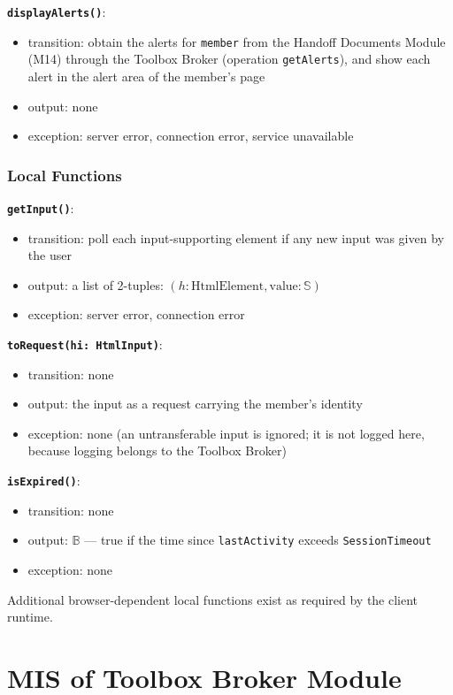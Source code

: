 \documentclass[12pt, titlepage]{article}
\begin{document}
\textbf{\texttt{displayAlerts()}}:
\begin{itemize}
  \item transition: obtain the alerts for \texttt{member} from the Handoff Documents Module (M14) through the Toolbox Broker (operation \texttt{getAlerts}), and show each alert in the alert area of the member's page
  \item output: none
  \item exception: server error, connection error, service unavailable
\end{itemize}

\subsubsection{Local Functions}

\textbf{\texttt{getInput()}}:
\begin{itemize}
  \item transition: poll each input-supporting element if any new input was given by the user
  \item output: a list of 2-tuples: $(h: \text{HtmlElement}, \text{value}: \mathbb{S})$
  \item exception: server error, connection error
\end{itemize}

\textbf{\texttt{toRequest(hi: HtmlInput)}}:
\begin{itemize}
  \item transition: none
  \item output: the input as a request carrying the member's identity
  \item exception: none (an untransferable input is ignored; it is not logged here, because logging belongs to the Toolbox Broker)
\end{itemize}

\textbf{\texttt{isExpired()}}:
\begin{itemize}
  \item transition: none
  \item output: $\mathbb{B}$ --- true if the time since \texttt{lastActivity} exceeds \texttt{SessionTimeout}
  \item exception: none
\end{itemize}

Additional browser-dependent local functions exist as required by the client runtime.

\newpage

\section{MIS of Toolbox Broker Module} \label{mBroker}
\end{document}
